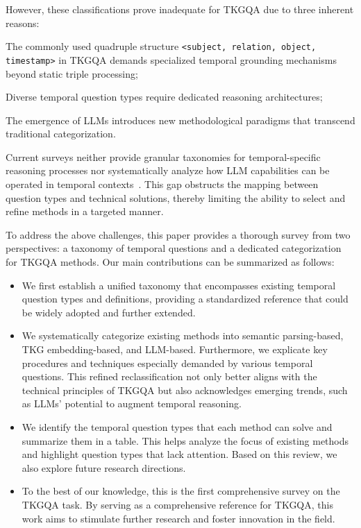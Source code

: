 However, these classifications prove inadequate for TKGQA due to three inherent reasons:
\begin{inparaenum}[(i)]
\item The commonly used quadruple structure \texttt{<subject, relation, object, timestamp>} in TKGQA demands specialized temporal grounding mechanisms beyond static triple processing;
\item Diverse temporal question types require dedicated reasoning architectures;
\item The emergence of LLMs introduces new methodological paradigms that transcend traditional categorization.
\end{inparaenum}
Current surveys neither provide granular taxonomies for temporal-specific reasoning processes nor systematically analyze how LLM capabilities can be operated in temporal contexts~\cite{guKnowledgeBaseQuestion2022a}. This gap obstructs the mapping between question types and technical solutions, thereby limiting the ability to select and refine methods in a targeted manner.


To address the above challenges, this paper provides a thorough survey from two perspectives: a taxonomy of temporal questions and a dedicated categorization for TKGQA methods. Our main contributions can be summarized as follows:
\begin{itemize}
    \item We first establish a unified taxonomy that encompasses existing temporal question types and definitions, providing a standardized reference that could be widely adopted and further extended.
    
    \item We systematically categorize existing methods into semantic parsing-based, TKG embedding-based, and LLM-based. Furthermore, we explicate key procedures and techniques especially demanded by various temporal questions. This refined reclassification not only better aligns with the technical principles of TKGQA but also acknowledges emerging trends, such as LLMs’ potential to augment temporal reasoning. 
    
    \item We identify the temporal question types that each method can solve and summarize them in a table. This helps analyze the focus of existing methods and highlight question types that lack attention. Based on this review, we also explore future research directions.

    \item To the best of our knowledge, this is the first comprehensive survey on the TKGQA task. By serving as a comprehensive reference for TKGQA, this work aims to stimulate further research and foster innovation in the field. 
\end{itemize}

